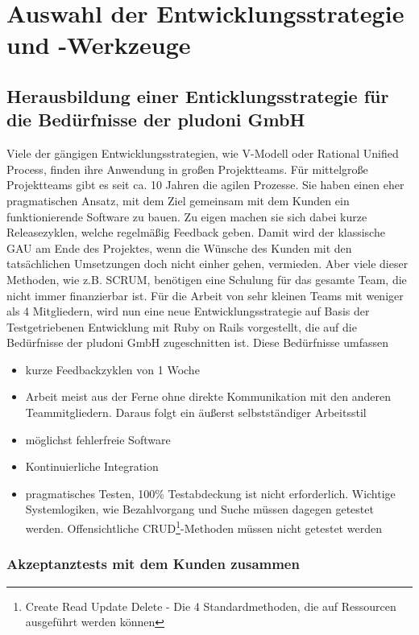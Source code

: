 \section{Auswahl der Entwicklungsstrategie und -Werkzeuge}
\subsection{Herausbildung einer Enticklungsstrategie für die Bedürfnisse der pludoni GmbH}
Viele der gängigen Entwicklungsstrategien, wie V-Modell oder Rational Unified Process, finden ihre Anwendung in großen Projektteams. Für mittelgroße Projektteams gibt es seit ca. 10 Jahren die agilen Prozesse. Sie haben einen eher pragmatischen Ansatz, mit dem Ziel gemeinsam mit dem Kunden ein funktionierende Software zu bauen. Zu eigen machen sie sich dabei kurze Releasezyklen, welche regelmäßig Feedback geben. Damit wird der klassische GAU am Ende des Projektes, wenn die Wünsche des Kunden mit den tatsächlichen Umsetzungen doch nicht einher gehen, vermieden. Aber viele dieser Methoden, wie z.B. SCRUM, benötigen eine Schulung für das gesamte Team, die nicht immer finanzierbar ist. 
Für die Arbeit von sehr kleinen Teams mit weniger als 4 Mitgliedern, wird nun eine neue Entwicklungsstrategie auf Basis der Testgetriebenen Entwicklung mit Ruby on Rails vorgestellt, die auf die Bedürfnisse der pludoni GmbH zugeschnitten ist.
Diese Bedürfnisse umfassen 
\begin{itemize}
 \item kurze Feedbackzyklen von 1 Woche
 \item Arbeit meist aus der Ferne ohne direkte Kommunikation mit den anderen Teammitgliedern. Daraus folgt ein äußerst selbstständiger Arbeitsstil
 \item möglichst fehlerfreie Software
 \item Kontinuierliche Integration
 \item pragmatisches Testen, 100\% Testabdeckung ist nicht erforderlich. Wichtige Systemlogiken, wie Bezahlvorgang und Suche müssen dagegen getestet werden. Offensichtliche CRUD\footnote{Create Read Update Delete - Die 4 Standardmethoden, die auf Ressourcen ausgeführt werden können}-Methoden müssen nicht getestet werden
\end{itemize}

\subsubsection{Akzeptanztests mit dem Kunden zusammen}

